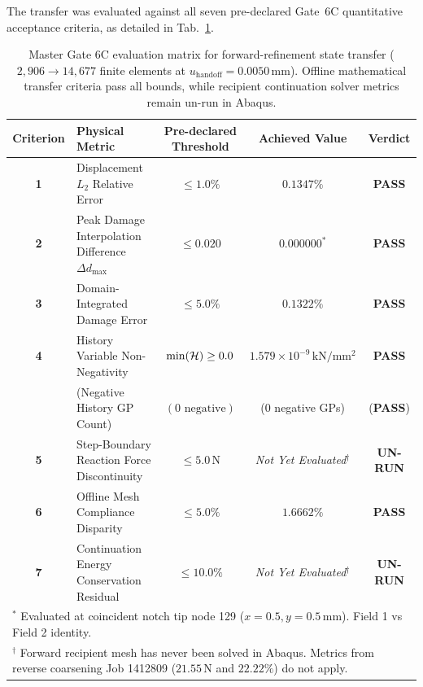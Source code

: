 The transfer was evaluated against all seven pre-declared Gate~6C quantitative acceptance criteria, as detailed in Tab.~\ref{tab:gate6c_forward_transfer_evaluation}.

\begin{table}[htbp]
\centering
\caption{Master Gate 6C evaluation matrix for forward-refinement state transfer ($2{,}906 \to 14{,}677$ finite elements at $u_{\mathrm{handoff}} = 0.0050\,\mathrm{mm}$). Offline mathematical transfer criteria pass all bounds, while recipient continuation solver metrics remain un-run in Abaqus.}
\label{tab:gate6c_forward_transfer_evaluation}
\small
\begin{tabular}{clccc}
\hline
\textbf{Criterion} & \textbf{Physical Metric} & \textbf{Pre-declared Threshold} & \textbf{Achieved Value} & \textbf{Verdict} \\
\hline
\textbf{1} & Displacement $L_2$ Relative Error & $\le 1.0\%$ & $0.1347\%$ & \textbf{PASS} \\
\textbf{2} & Peak Damage Interpolation Difference $\Delta d_{\max}$ & $\le 0.020$ & $0.000000^*$ & \textbf{PASS} \\
\textbf{3} & Domain-Integrated Damage Error & $\le 5.0\%$ & $0.1322\%$ & \textbf{PASS} \\
\textbf{4} & History Variable Non-Negativity & $\min(\mathcal{H}) \ge 0.0$ & $1.579 \times 10^{-9}\,\mathrm{kN/mm^2}$ & \textbf{PASS} \\
 & (Negative History GP Count) & $(0\text{ negative})$ & ($0$ negative GPs) & (\textbf{PASS}) \\
\textbf{5} & Step-Boundary Reaction Force Discontinuity & $\le 5.0\,\mathrm{N}$ & \emph{Not Yet Evaluated}$^\dagger$ & \textbf{UN-RUN} \\
\textbf{6} & Offline Mesh Compliance Disparity & $\le 5.0\%$ & $1.6662\%$ & \textbf{PASS} \\
\textbf{7} & Continuation Energy Conservation Residual & $\le 10.0\%$ & \emph{Not Yet Evaluated}$^\dagger$ & \textbf{UN-RUN} \\
\hline
\multicolumn{5}{l}{\footnotesize $^*$ Evaluated at coincident notch tip node 129 ($x=0.5, y=0.5\,\mathrm{mm}$). Field 1 vs Field 2 identity.} \\
\multicolumn{5}{l}{\footnotesize $^\dagger$ Forward recipient mesh has never been solved in Abaqus. Metrics from reverse coarsening Job 1412809 ($21.55\,\mathrm{N}$ and $22.22\%$) do not apply.}
\end{tabular}
\end{table}

